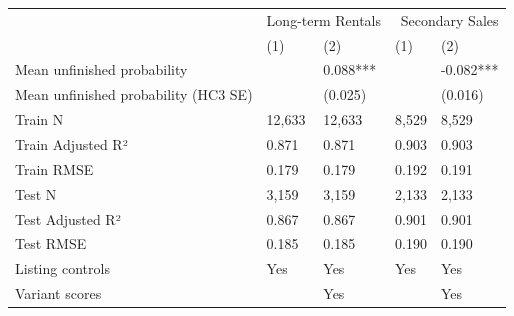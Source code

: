 \begin{tabular}{lllll}
\toprule
 & \multicolumn{2}{r}{Long-term Rentals} & \multicolumn{2}{r}{Secondary Sales} \\
 & (1) & (2) & (1) & (2) \\
\midrule
Mean unfinished probability &  & 0.088*** &  & -0.082*** \\
Mean unfinished probability (HC3 SE) &  & (0.025) &  & (0.016) \\
Train N & 12,633 & 12,633 & 8,529 & 8,529 \\
Train Adjusted R² & 0.871 & 0.871 & 0.903 & 0.903 \\
Train RMSE & 0.179 & 0.179 & 0.192 & 0.191 \\
Test N & 3,159 & 3,159 & 2,133 & 2,133 \\
Test Adjusted R² & 0.867 & 0.867 & 0.901 & 0.901 \\
Test RMSE & 0.185 & 0.185 & 0.190 & 0.190 \\
Listing controls & Yes & Yes & Yes & Yes \\
Variant scores &  & Yes &  & Yes \\
\bottomrule
\end{tabular}
